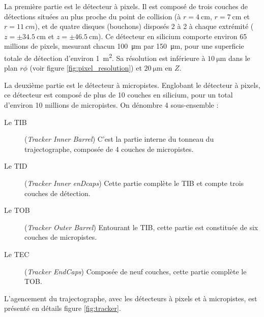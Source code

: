 \smallskip

La première partie est le détecteur à pixels. Il est composé de trois couches de détections situées au plus proche du point de collision (à $r = \SI{4}{\cm}$, $r = \SI{7}{\cm}$ et $r = \SI{11}{cm}$), et de quatre disques (bouchons) disposés 2 à 2 à chaque extrémité ($z = \pm \SI{34.5}{\cm}$ et $z = \pm \SI{46.5}{\cm}$). Ce détecteur en silicium comporte environ 65 millions de pixels, mesurant chacun \SI{100}{\um} par \SI{150}{\um}, pour une superficie totale de détection d'environ \SI{1}{\square\m}. Sa résolution est inférieure à $\SI{10}{\um}$ dans le plan $r\phi$ (voir figure \ref{fig:pixel_resolution}) et $\SI{20}{\um}$ en $Z$.

La deuxième partie est le détecteur à micropistes. Englobant le détecteur à pixels, ce détecteur est composé de plus de 10 couches en silicium, pour un total d'environ 10 millions de micropistes. On dénombre 4 sous-ensemble :

\begin{description}
  \item[Le TIB] (\emph{Tracker Inner Barrel}) C'est la partie interne du tonneau du trajectographe, composée de 4 couches de micropistes.
  \item[Le TID] (\emph{Tracker Inner enDcaps}) Cette partie complète le TIB et compte trois couches de détection.
  \item[Le TOB] (\emph{Tracker Outer Barrel}) Entourant le TIB, cette partie est constituée de six couches de micropistes.
  \item[Le TEC] (\emph{Tracker EndCaps}) Composée de neuf couches, cette partie complète le TOB.
\end{description}

L'agencement du trajectographe, avec les détecteurs à pixels et à micropistes, est présenté en détails figure \ref{fig:tracker}.


